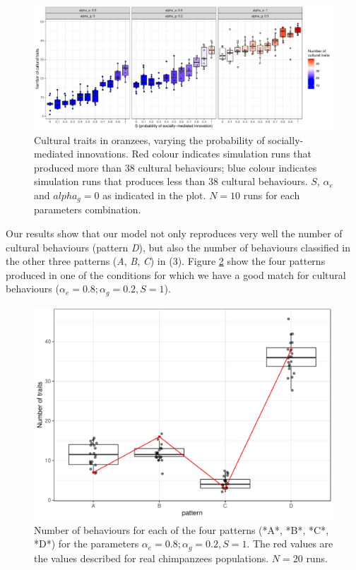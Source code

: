 \documentclass[9pt,twocolumn,twoside,]{pnas-new}
\begin{document}
\begin{figure}[h!]
\begin{center}
\includegraphics[width=17.8cm]{figures/figure_2.pdf}
\caption{Cultural traits in oranzees, varying the probability of socially-mediated innovations. Red colour indicates simulation runs that produced more than 38 cultural behaviours; blue colour indicates simulation runs that produces less than 38 cultural behaviours. $S$, $\alpha_e$ and $alpha_g=0$ as indicated in the plot. $N=10$ runs for each parameters combination.}
\label{Figure2}
\end{center}
\end{figure}

Our results show that our model not only reproduces very well the number
of cultural behaviours (pattern \emph{D}), but also the number of
behaviours classified in the other three patterns (\emph{A}, \emph{B},
\emph{C}) in (3). Figure \ref{Figure3} show the four patterns produced
in one of the conditions for which we have a good match for cultural
behaviours (\(\alpha_e=0.8;\alpha_g=0.2, S=1\)).

\begin{figure}[h!]
\begin{center}
\includegraphics[width=11.4cm]{figures/figure_3.pdf}
\caption{Number of behaviours for each of the four patterns (*A*, *B*, *C*, *D*) for the parameters $\alpha_e=0.8;\alpha_g=0.2,S=1$. The red values are the values described for real chimpanzees populations. $N=20$ runs.}
\label{Figure3}
\end{center}
\end{figure}
\end{document}
